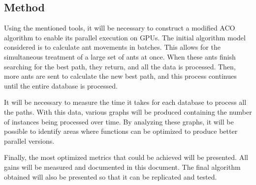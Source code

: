 \subsection{Method} \label{Method}

Using the mentioned tools, it will be necessary to construct a modified ACO algorithm to enable its parallel execution on GPUs. The initial algorithm model considered is to calculate ant movements in batches. This allows for the simultaneous treatment of a large set of ants at once. When these ants finish searching for the best path, they return, and all the data is processed. Then, more ants are sent to calculate the new best path, and this process continues until the entire database is processed.

It will be necessary to measure the time it takes for each database to process all the paths. With this data, various graphs will be produced containing the number of instances being processed over time. By analyzing these graphs, it will be possible to identify areas where functions can be optimized to produce better parallel versions.

Finally, the most optimized metrics that could be achieved will be presented. All gains will be measured and documented in this document. The final algorithm obtained will also be presented so that it can be replicated and tested.
